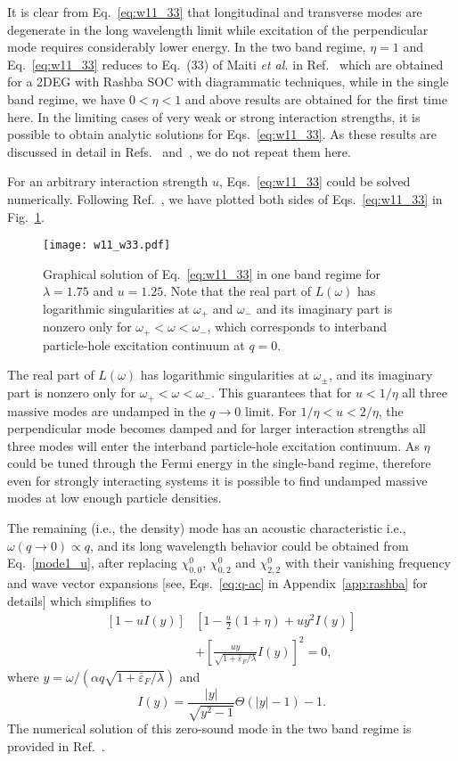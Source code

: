 \documentclass[aps, pra, reprint,superscriptaddress]{revtex4-1}
\def\be{\begin{equation}}
\def\ee{\end{equation}}
\begin{document}
It is clear from Eq.~\eqref{eq:w11_33} that longitudinal and transverse modes are degenerate in the long wavelength limit while excitation of the perpendicular mode requires considerably lower energy. 
In the two band regime, $\eta=1$ and Eq.~\eqref{eq:w11_33} reduces to Eq.~(33) of Maiti \textit{et al.} in Ref.~\cite{Maiti2015} which are obtained for a 2DEG with Rashba SOC with diagrammatic techniques, while in the single band regime, we have $0<\eta<1$ and above results are obtained for the first time here. 
In the limiting cases of very weak or strong interaction strengths, it is possible to obtain analytic solutions for Eqs.~\eqref{eq:w11_33}. As these results are discussed in detail in Refs.~\cite{Maiti2015} and~\cite{Zhang_pra2013}, we do not repeat them here. 

For an arbitrary interaction strength $u$, Eqs.~\eqref{eq:w11_33} could be solved numerically. Following Ref.~\cite{Maiti2015}, we have plotted both sides of Eqs.~\eqref{eq:w11_33} in Fig.~\ref{fig:w11_w33}. 
\begin{figure}
\centering
\texttt{[image: w11\_w33.pdf]}
\caption{Graphical solution of Eq.~\eqref{eq:w11_33} in one band regime  for $\lambda=1.75$ and $u=1.25$. 
Note that the real part of $L(\omega)$ has logarithmic singularities at $\omega_+$ and $\omega_-$ and its imaginary part is nonzero only for $\omega_+<\omega<\omega_-$, which corresponds to interband particle-hole excitation continuum at $q=0$. 
\label{fig:w11_w33}}
\end{figure}
The real part of $L(\omega)$ has logarithmic singularities at $\omega_\pm$, and its imaginary part is nonzero only for  $\omega_{+}<\omega<\omega_{-}$. This guarantees that for $u <1/\eta$ all three massive modes are undamped in the $q\to 0$ limit. For $1/\eta<u<2/\eta$, the perpendicular mode becomes damped and for larger interaction strengths all three modes will enter the interband particle-hole excitation continuum. As $\eta$ could be tuned through the Fermi energy in the single-band regime, therefore even for strongly interacting systems it is possible to find undamped massive modes at low enough particle densities. 

The remaining (i.e., the density) mode has an acoustic characteristic i.e., $\omega(q\to0)\propto q$, and its long wavelength behavior could be obtained from Eq.~\eqref{mode1_u}, after replacing $\chi^0_{0,0}$, $\chi^0_{0,2}$ and $\chi^0_{2,2}$ with their vanishing frequency and wave vector expansions [see, Eqs.~\eqref{eq:q-ac} in Appendix~\ref{app:rashba} for details] which simplifies to
\be\label{Zero_sound_one_band}
\begin{split}
\left[1-u I(y)\right]&
 \left[1-\frac{u}{2}(1+\eta)+ u y^2 
I(y)\right]
\\
&+\left[\frac{u y}{\sqrt{1+\bar{\varepsilon}_{F}/\lambda}}I(y)\right]^2=0,
\end{split}
\ee
where $y=\omega/(\alpha q \sqrt{1+\bar{\varepsilon}_{F}/\lambda})$ and
\be\label{eq:iy}
I(y)=\frac{\vert y \vert}{\sqrt{y^2-1}}\Theta(\vert y \vert -1)-1.
\ee
The numerical solution of this zero-sound mode in the two band regime is provided in Ref.~\cite{Zhang_pra2013}.
\end{document}
